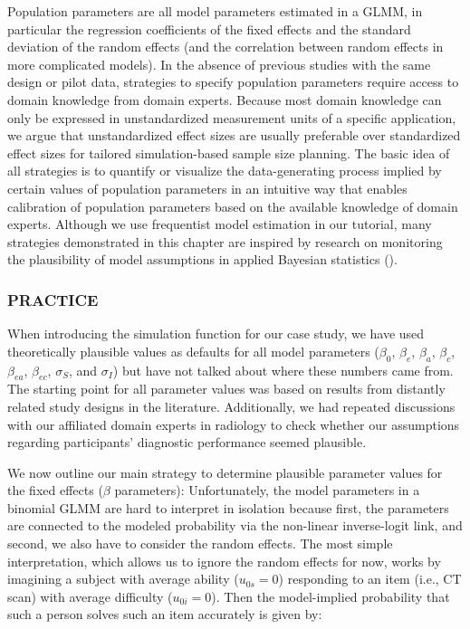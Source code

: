 \documentclass[
  man,
  floatsintext,
  longtable,
  a4paper,
  nolmodern,
  notxfonts,
  notimes,
  colorlinks=true,linkcolor=blue,citecolor=blue,urlcolor=blue]{apa7}
\begin{document}
Population parameters are all model parameters estimated in a GLMM, in
particular the regression coefficients of the fixed effects and the
standard deviation of the random effects (and the correlation between
random effects in more complicated models). In the absence of previous
studies with the same design or pilot data, strategies to specify
population parameters require access to domain knowledge from domain
experts. Because most domain knowledge can only be expressed in
unstandardized measurement units of a specific application, we argue
that unstandardized effect sizes are usually preferable over
standardized effect sizes for tailored simulation-based sample size
planning. The basic idea of all strategies is to quantify or visualize
the data-generating process implied by certain values of population
parameters in an intuitive way that enables calibration of population
parameters based on the available knowledge of domain experts. Although
we use frequentist model estimation in our tutorial, many strategies
demonstrated in this chapter are inspired by research on monitoring the
plausibility of model assumptions in applied Bayesian statistics
().

\subsubsection{PRACTICE}\label{practice-2}

When introducing the simulation function for our case study, we have
used theoretically plausible values as defaults for all model parameters
(\(\beta_0\), \(\beta_e\), \(\beta_a\), \(\beta_c\), \(\beta_{ea}\),
\(\beta_{ec}\), \(\sigma_S\), and \(\sigma_I\)) but have not talked
about where these numbers came from. The starting point for all
parameter values was based on results from distantly related study
designs in the literature. Additionally, we had repeated discussions
with our affiliated domain experts in radiology to check whether our
assumptions regarding participants' diagnostic performance seemed
plausible.

We now outline our main strategy to determine plausible parameter values
for the fixed effects (\(\beta\) parameters): Unfortunately, the model
parameters in a binomial GLMM are hard to interpret in isolation because
first, the parameters are connected to the modeled probability via the
non-linear inverse-logit link, and second, we also have to consider the
random effects. The most simple interpretation, which allows us to
ignore the random effects for now, works by imagining a subject with
average ability (\(u_{0s} = 0\)) responding to an item (i.e., CT scan)
with average difficulty (\(u_{0i} = 0\)). Then the model-implied
probability that such a person solves such an item accurately is given
by:
\end{document}
